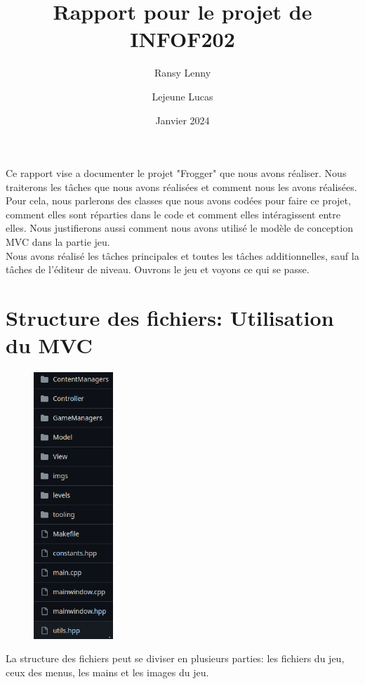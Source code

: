 \documentclass[a4paper, 12pt]{article}
\title{\textbf{Rapport pour le projet de INFOF202}}
\author{
    Ransy Lenny
    \and
    Lejeune Lucas
    }
\date{Janvier 2024}
\begin{document}
\setlength{\parindent}{0em}

\maketitle

Ce rapport vise a documenter le projet "Frogger" que nous avons réaliser. 
Nous traiterons les tâches que nous avons réalisées et comment nous les avons réalisées. 
Pour cela, nous parlerons des classes que nous avons codées pour faire ce projet, 
comment elles sont réparties dans le code et comment elles intéragissent entre elles. 
Nous justifierons aussi comment nous avons utilisé le modèle de conception MVC dans 
la partie jeu. \\

Nous avons réalisé les tâches principales et toutes les tâches additionnelles, sauf la tâches de l'éditeur de niveau. 
Ouvrons le jeu et voyons ce qui se passe. 

\section{Structure des fichiers: Utilisation du MVC}
\begin{figure}
    \includegraphics[width=3cm]{Images/folders.png}
\end{figure}

La structure des fichiers peut se diviser en plusieurs parties: les fichiers du jeu, ceux des menus, les mains et les images du jeu. \\
\end{document}
